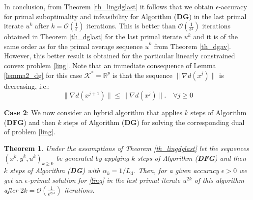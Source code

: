 \documentclass{gOMS2e}
\theoremstyle{plain}
\newtheorem{theorem}{Theorem}[section]
\theoremstyle{definition}
\theoremstyle{remark}
\begin{document}
\noindent  In conclusion,  from Theorem \ref{th_lingdglast} it
follows that we obtain $\epsilon$-accuracy for primal suboptimality
and infeasibility for Algorithm (\textbf{DG}) in the last primal
iterate $u^{k}$ after $k = \mathcal{O}(\frac{1}{\epsilon})$
iterations. This is better than $\mathcal{O}(\frac{1}{\epsilon^2})$
iterations  obtained in Theorem \ref{th_dglast}  for the last primal
iterate $u^k$ and it is of the same order as for the primal average
sequence  $\hat u^k$ from Theorem \ref{th_dgav}. However, this
better result is obtained for the particular linearly constrained
convex problem \eqref{ling}. Note that an immediate consequence of
Lemma \ref{lemma2_dg}  for this case ${\mathcal{K}}^* = {\mathbb{R}}^p$  is that the
sequence  $\|\nabla d(x^j)\|$ is  decreasing, i.e.: $$\|\nabla
d(x^{j+1})\| \leq \|\nabla d(x^{j})\|.  \quad  \forall j \geq 0$$

\vspace{0.2cm}

\noindent \textbf{Case 2}:  We now consider an hybrid algorithm
that applies  $k$ steps of  Algorithm  (\textbf{DFG}) and then $k$
steps of  Algorithm  (\textbf{DG}) for solving the corresponding
dual of  problem \eqref{ling}.

\begin{theorem}
\label{th_linghdfgdglast} Under the assumptions of Theorem
\ref{th_lingdglast}  let the sequences $\left(x^k, y^k,
u^k\right)_{k\geq 0}$ be generated by  applying $k$ steps of
Algorithm  (\textbf{DFG}) and then $k$ steps of  Algorithm
(\textbf{DG})  with $\alpha_k = 1/L_\text{d}$. Then, for a given
accuracy $\epsilon>0$ we get an $\epsilon$-primal solution for
\eqref{ling} in the last primal  iterate $u^{2k}$ of  this algorithm
after $2k = {\mathcal O} (\frac{1}{\epsilon^{2/3}})$ iterations.
\end{theorem}
\end{document}
